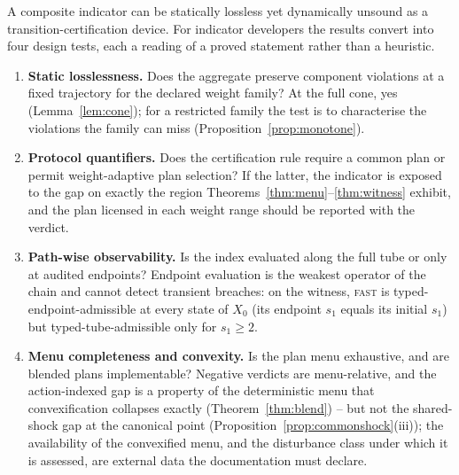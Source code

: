 \documentclass[preprint,11pt,authoryear]{elsarticle}
\theoremstyle{definition}
\theoremstyle{remark}
\newcommand{\act}[1]{\textsc{#1}}
\begin{document}
A composite indicator can be statically lossless yet dynamically unsound as a transition-certification device. For indicator developers the results convert into four design tests, each a reading of a proved statement rather than a heuristic.
\begin{enumerate}[leftmargin=2em]
\item \textbf{Static losslessness.} Does the aggregate preserve component violations at a fixed trajectory for the declared weight family? At the full cone, yes (Lemma~\ref{lem:cone}); for a restricted family the test is to characterise the violations the family can miss (Proposition~\ref{prop:monotone}).
\item \textbf{Protocol quantifiers.} Does the certification rule require a common plan or permit weight-adaptive plan selection? If the latter, the indicator is exposed to the gap on exactly the region Theorems~\ref{thm:menu}--\ref{thm:witness} exhibit, and the plan licensed in each weight range should be reported with the verdict.
\item \textbf{Path-wise observability.} Is the index evaluated along the full tube or only at audited endpoints? Endpoint evaluation is the weakest operator of the chain and cannot detect transient breaches: on the witness, \act{fast} is typed-endpoint-admissible at every state of $X_0$ (its endpoint $s_1$ equals its initial $s_1$) but typed-tube-admissible only for $s_1\ge2$.
\item \textbf{Menu completeness and convexity.} Is the plan menu exhaustive, and are blended plans implementable? Negative verdicts are menu-relative, and the action-indexed gap is a property of the deterministic menu that convexification collapses exactly (Theorem~\ref{thm:blend}) -- but not the shared-shock gap at the canonical point (Proposition~\ref{prop:commonshock}(iii)); the availability of the convexified menu, and the disturbance class under which it is assessed, are external data the documentation must declare.
\end{enumerate}
\end{document}
